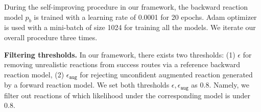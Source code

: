 During the self-improving procedure in our framework, the backward reaction model $p_{b}$ is trained with a learning rate of 0.0001 for 20 epochs.
Adam optimizer \citep{kingma2014adam} is used with a mini-batch of size 1024 for training all the models. We iterate our overall procedure three times.











\textbf{Filtering thresholds.}
In our framework, there exists two thresholds: (1) $\epsilon$ for removing unrealistic reactions from success routes via a reference backward reaction model, (2) $\epsilon_{\mathtt{aug}}$ for rejecting unconfident augmented reaction generated by a forward reaction model. We set both thresholds $\epsilon, \epsilon_{\mathtt{aug}}$ as 0.8. Namely, we filter out reactions of which likelihood under the corresponding model is under 0.8.


















